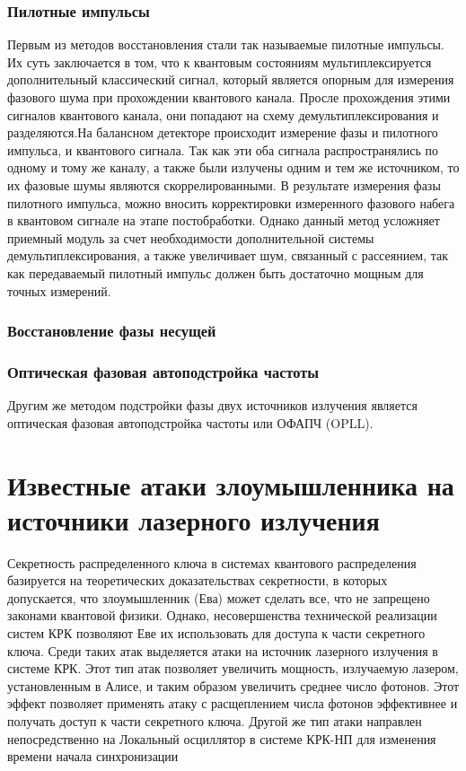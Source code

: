 \subsubsection{Пилотные импульсы}Первым из методов восстановления стали так называемые пилотные импульсы. Их суть заключается в том, что к квантовым состояниям мультиплексируется дополнительный классический сигнал, который является опорным для измерения фазового шума при прохождении квантового канала. Просле прохождения этими сигналов квантового канала, они попадают на схему демультиплексирования и разделяются.На балансном детекторе происходит измерение фазы и пилотного импульса, и квантового сигнала. Так как эти оба сигнала распространялись по одному и тому же каналу, а также были излучены одним и тем же источником, то их фазовые шумы являются скоррелированными. В результате измерения фазы  пилотного импульса, можно вносить корректировки измеренного фазового набега в квантовом сигнале на этапе постобработки. 
\newline Однако данный метод усложняет приемный модуль за счет необходимости дополнительной системы демультиплексирования, а также увеличивает шум, связанный с рассеянием, так как передаваемый  пилотный импульс должен быть достаточно мощным для точных измерений.
\subsubsection{Восстановление фазы несущей}
\subsubsection{Оптическая фазовая автоподстройка частоты}
Другим же методом подстройки фазы двух источников излучения является оптическая фазовая автоподстройка частоты или ОФАПЧ (OPLL). 

\section{Известные атаки злоумышленника на источники лазерного излучения}\label{sec:ch1/sect7}
Секретность распределенного ключа в системах квантового распределения базируется на теоретических доказательствах секретности, в которых допускается, что злоумышленник (Ева) может сделать все, что не запрещено законами квантовой физики. Однако, несовершенства технической реализации систем КРК позволяют Еве их использовать для доступа к части секретного ключа. Среди таких атак выделяется атаки на источник лазерного излучения в системе КРК. Этот тип атак позволяет увеличить мощность, излучаемую лазером, установленным в Алисе, и таким образом увеличить среднее число фотонов. Этот эффект позволяет применять атаку с расщеплением числа фотонов эффективнее и получать доступ к части секретного ключа. 
\newline Другой же тип атаки направлен непосредственно на Локальный осциллятор в системе КРК-НП для изменения времени начала синхронизации
